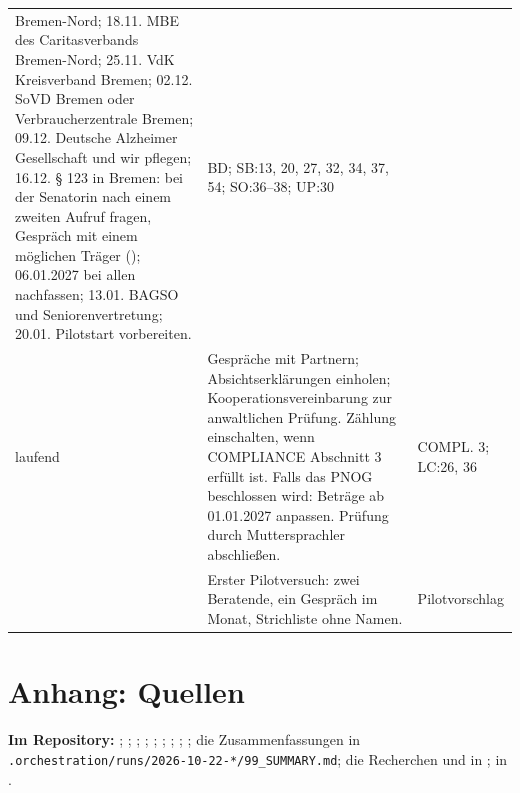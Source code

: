 \documentclass[10pt,parskip=half-]{scrartcl}
\begin{document}
{\begin{longtable}{@{}P{20mm}P{112mm}P{20mm}@{}}
  Bremen-Nord; 18.11. MBE des Caritasverbands Bremen-Nord; 25.11. VdK Kreisverband Bremen;
  02.12. SoVD Bremen oder Verbraucherzentrale Bremen; 09.12. Deutsche Alzheimer Gesellschaft
  und wir pflegen; 16.12. § 123 in Bremen: bei der Senatorin nach einem zweiten Aufruf fragen,
  Gespräch mit einem möglichen Träger (); 06.01.2027 bei allen
  nachfassen; 13.01. BAGSO und Seniorenvertretung; 20.01. Pilotstart vorbereiten. & BD; SB:13,
  20, 27, 32, 34, 37, 54; SO:36--38; UP:30 \\
laufend & Gespräche mit Partnern; Absichtserklärungen einholen; Kooperationsvereinbarung zur
  anwaltlichen Prüfung. Zählung einschalten, wenn COMPLIANCE Abschnitt 3 erfüllt ist. Falls das
  PNOG beschlossen wird: Beträge ab 01.01.2027 anpassen. Prüfung durch Muttersprachler
  abschließen. & COMPL. 3; LC:26, 36 \\
 & Erster Pilotversuch: zwei Beratende, ein Gespräch im Monat, Strichliste
  ohne Namen. & Pilot\-vorschlag \\
\bottomrule
\end{longtable}
}

\section{Anhang: Quellen}

{\tiny\raggedright\textbf{Im Repository:}
; ; ;
; ;
; ;
; ; die Zusammenfassungen in
\nolinkurl{.orchestration/runs/2026-10-22-*/99_SUMMARY.md}; die Recherchen
 und  in
;  in
.\par}
\end{document}
